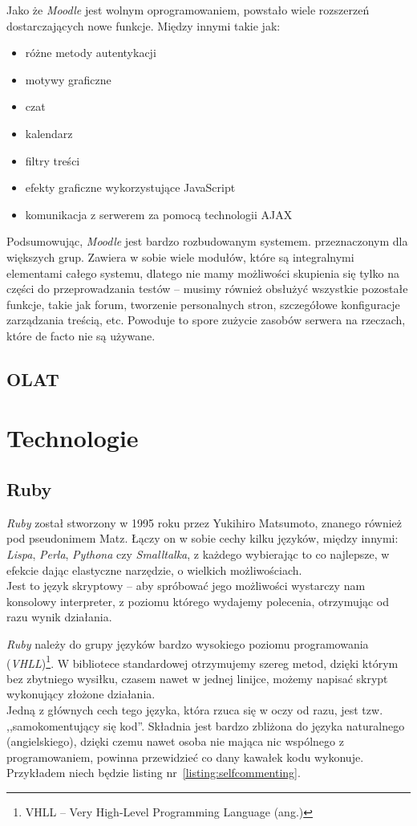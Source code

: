 \documentclass[a4paper,12pt]{article}
\begin{document}
Jako że \emph{Moodle} jest wolnym oprogramowaniem, powstało wiele rozszerzeń
dostarczających nowe funkcje. Między innymi takie jak:

\begin{itemize}
  \item{różne metody autentykacji}
  \item{motywy graficzne}
  \item{czat}
  \item{kalendarz}
  \item{filtry treści}
  \item{efekty graficzne wykorzystujące JavaScript}
  \item{komunikacja z serwerem za pomocą technologii AJAX}
\end{itemize}


Podsumowując, \emph{Moodle} jest bardzo rozbudowanym systemem. przeznaczonym dla większych
grup. Zawiera w sobie wiele modułów, które są integralnymi elementami całego systemu, dlatego
nie mamy możliwości skupienia się tylko na części do przeprowadzania testów -- musimy
również obsłużyć wszystkie pozostałe funkcje, takie jak forum, tworzenie personalnych
stron, szczegółowe konfiguracje zarządzania treścią, etc. Powoduje to spore zużycie
zasobów serwera na rzeczach, które de facto nie są używane.

\subsection{OLAT}

\clearpage
\section{Technologie}
\subsection{Ruby}
\emph{Ruby} został stworzony w 1995 roku przez Yukihiro Matsumoto, znanego również
pod pseudonimem Matz. Łączy on w sobie cechy kilku języków, między innymi: \emph{Lispa},
\emph{Perla}, \emph{Pythona} czy \emph{Smalltalka}, z każdego wybierając to co najlepsze,
w efekcie dając elastyczne narzędzie, o wielkich możliwościach.\\
Jest to język skryptowy -- aby spróbować jego możliwości wystarczy nam konsolowy
interpreter, z poziomu którego wydajemy polecenia, otrzymując od razu wynik działania.


\emph{Ruby} należy do grupy języków bardzo wysokiego poziomu programowania
(\emph{VHLL})\footnote{VHLL -- Very High-Level Programming Language (ang.)}.
W bibliotece standardowej otrzymujemy szereg metod, dzięki którym bez zbytniego wysiłku,
czasem nawet w jednej linijce, możemy napisać skrypt wykonujący złożone działania.\\
Jedną z głównych cech tego języka, która rzuca się w oczy od razu, jest tzw.
,,samokomentujący się kod''. Składnia jest bardzo zbliżona do języka naturalnego
(angielskiego), dzięki czemu nawet osoba nie mająca nic wspólnego z programowaniem,
powinna przewidzieć co dany kawałek kodu wykonuje. Przykładem niech będzie
listing nr~\ref{listing:selfcommenting}.
\end{document}
